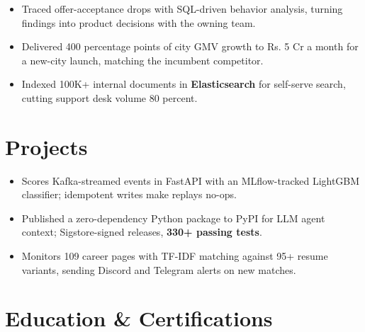 \documentclass[letterpaper,10pt]{article}
\begin{document}
\begin{itemize}
\item Traced offer-acceptance drops with SQL-driven behavior analysis, turning findings into product decisions with the owning team.
\end{itemize}

\begin{itemize}
\item Delivered 400 percentage points of city GMV growth to Rs. 5 Cr a month for a new-city launch, matching the incumbent competitor.
\end{itemize}

\begin{itemize}
\item Indexed 100K+ internal documents in \textbf{Elasticsearch} for self-serve search, cutting support desk volume 80 percent.
\end{itemize}

\section{Projects}
\begin{itemize}
\item Scores Kafka-streamed events in FastAPI with an MLflow-tracked LightGBM classifier; idempotent writes make replays no-ops.
\end{itemize}
\begin{itemize}
\item Published a zero-dependency Python package to PyPI for LLM agent context; Sigstore-signed releases, \textbf{330+ passing tests}.
\end{itemize}
\begin{itemize}
\item Monitors 109 career pages with TF-IDF matching against 95+ resume variants, sending Discord and Telegram alerts on new matches.
\end{itemize}

\section{Education \& Certifications}
\end{document}
